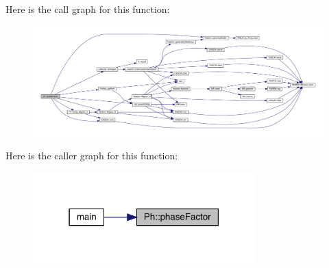 Here is the call graph for this function\+:
\nopagebreak
\begin{figure}[H]
\begin{center}
\leavevmode
\includegraphics[width=350pt]{d6/d3c/namespacePh_ad2fd8f885053b0833441c8388a9218b8_cgraph}
\end{center}
\end{figure}
Here is the caller graph for this function\+:
\nopagebreak
\begin{figure}[H]
\begin{center}
\leavevmode
\includegraphics[width=243pt]{d6/d3c/namespacePh_ad2fd8f885053b0833441c8388a9218b8_icgraph}
\end{center}
\end{figure}
